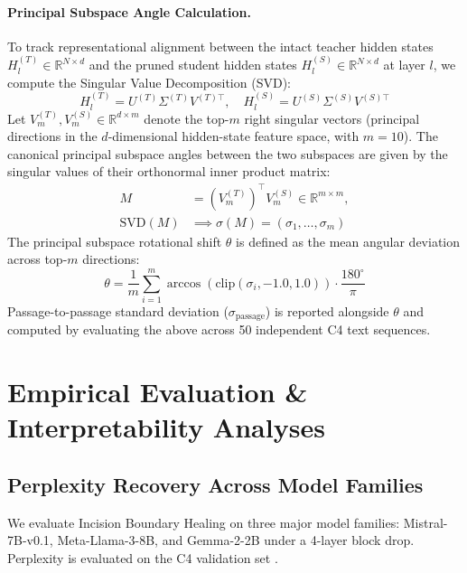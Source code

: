 \documentclass[11pt]{article}
\begin{document}
\paragraph{Principal Subspace Angle Calculation.}
To track representational alignment between the intact teacher hidden states $H^{(T)}_l \in \mathbb{R}^{N \times d}$ and the pruned student hidden states $H^{(S)}_l \in \mathbb{R}^{N \times d}$ at layer $l$, we compute the Singular Value Decomposition (SVD):
\begin{equation}
H^{(T)}_l = U^{(T)} \Sigma^{(T)} V^{(T)\top}, \quad H^{(S)}_l = U^{(S)} \Sigma^{(S)} V^{(S)\top}
\end{equation}
Let $V_m^{(T)}, V_m^{(S)} \in \mathbb{R}^{d \times m}$ denote the top-$m$ right singular vectors (principal directions in the $d$-dimensional hidden-state feature space, with $m=10$). The canonical principal subspace angles between the two subspaces are given by the singular values of their orthonormal inner product matrix:
\begin{equation}
\begin{aligned}
M &= (V_m^{(T)})^\top V_m^{(S)} \in \mathbb{R}^{m \times m}, \\
\mathrm{SVD}(M) &\implies \sigma(M) = (\sigma_1, \dots, \sigma_m)
\end{aligned}
\end{equation}
The principal subspace rotational shift $\theta$ is defined as the mean angular deviation across top-$m$ directions:
\begin{equation}
\theta = \frac{1}{m} \sum_{i=1}^{m} \arccos\left(\mathrm{clip}(\sigma_i, -1.0, 1.0)\right) \cdot \frac{180^\circ}{\pi}
\end{equation}
Passage-to-passage standard deviation ($\sigma_{\text{passage}}$) is reported alongside $\theta$ and computed by evaluating the above across 50 independent C4 text sequences.

\section{Empirical Evaluation \& Interpretability Analyses}

\subsection{Perplexity Recovery Across Model Families}

We evaluate Incision Boundary Healing on three major model families: Mistral-7B-v0.1, Meta-Llama-3-8B, and Gemma-2-2B under a 4-layer block drop. Perplexity is evaluated on the C4 validation set \citep{raffel2020c4}.
\end{document}
